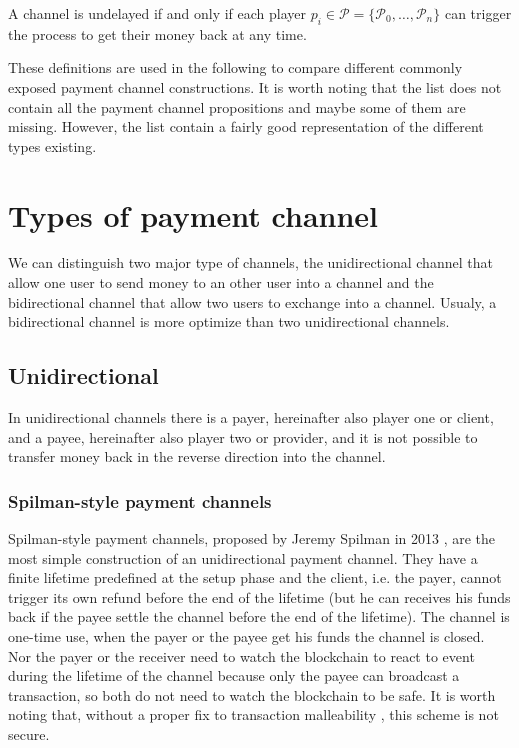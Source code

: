 \begin{definition}[Undelayed]
  A channel is undelayed if and only if each player $p_i \in \mathcal{P} = \{\mathcal{P}_0,
  \dots, \mathcal{P}_n\}$ can trigger the process to get their money back at any time.
\end{definition}

These definitions are used in the following to compare different commonly exposed
payment channel constructions. It is worth noting that the list does not contain all
the payment channel propositions and maybe some of them are missing. However, the
list contain a fairly good representation of the different types existing.

\minitoc

\newpage

\section{Types of payment channel}

We can distinguish two major type of channels, the unidirectional channel that allow
one user to send money to an other user into a channel and the bidirectional channel
that allow two users to exchange into a channel. Usualy, a bidirectional channel is
more optimize than two unidirectional channels.

\subsection{Unidirectional}

In unidirectional channels there is a payer, hereinafter also player one or client, and
a payee, hereinafter also player two or provider, and it is not possible to transfer
money back in the reverse direction into the channel.

\subsubsection{Spilman-style payment channels}

Spilman-style payment channels, proposed by Jeremy Spilman in 2013 \cite{SpilmanStyle},
are the most simple construction of an unidirectional
payment channel. They have a finite lifetime predefined at the setup phase and the client,
i.e. the payer, cannot trigger its own refund before the end of the lifetime (but he can
receives his funds back if the payee settle the channel before the end of the lifetime).
The channel is one-time use, when the payer or the payee get his funds the channel is
closed. Nor the payer or the receiver need to watch the blockchain to react to event
during the lifetime of the channel because only the payee can broadcast a transaction,
so both do not need to watch the blockchain to be safe.
It is worth noting that, without a proper fix to transaction malleability
\cite{SegWitBIP, BIP62, DBLP:journals/corr/AndrychowiczDMM13, DBLP:journals/corr/DeckerW14},
this scheme is not secure.

